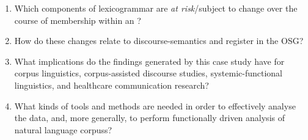 \begin{enumerate}\setlength\itemsep{0em}
\item Which components of \gls{lexicogrammar} are \emph{at risk}\slash subject to change over the course of membership within an ?
\item How do these changes relate to \glspl{discourse-semantic} and register in the \gls{OSG}?
\item What implications do the findings generated by this case study have for corpus linguistics, corpus\hyp{}assisted discourse studies, systemic\hyp{}functional linguistics, and healthcare communication research?
\item What kinds of tools and methods are needed in order to effectively analyse the data, and, more generally, to perform functionally driven analysis of natural language \glspl{corpus}?
\end{enumerate}
